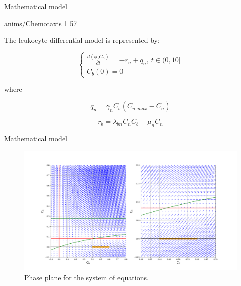 \documentclass[serif,8pt, aspectratio=169]{beamer}
\begin{document}
    \begin{frame}[fragile]{Mathematical model}
        \begin{minipage}{0.55\linewidth}
            \centering %
            {anims/Chemotaxis}%
            {1}%
            {57}%
        \end{minipage}
        \begin{minipage}{0.4\linewidth}
            The leukocyte differential model is represented by:

            \begin{equation}
            \left\{\begin{matrix}
             \frac{d(\phi_fC_n)}{dt}=-r_n+q_n,~t\in(0,10]\\
             C_b(0) = 0
            \end{matrix}\right.
            \end{equation}

            where 
            
            \begin{equation}
                q_n = \gamma_nC_b(C_{n,max}-C_n)
            \end{equation}

            \begin{equation}
                r_b = \lambda_{bn}C_nC_b+\mu_nC_n
            \end{equation}
        \end{minipage}
    \end{frame}

    \begin{frame}[fragile]{Mathematical model}
        \begin{figure}
            \centering
            \includegraphics[width=0.8\linewidth]{pic/phase_plane.png}
            \caption{Phase plane for the system of equations.}
            \label{fig:phase-plane}
        \end{figure}
    \end{frame}
\end{document}
